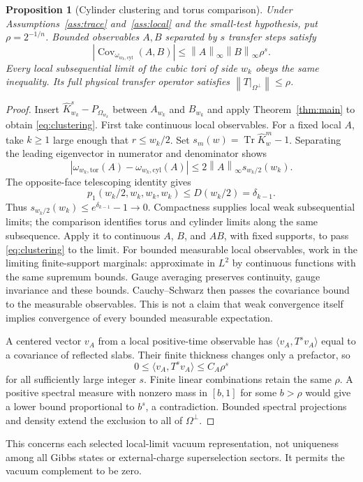 \documentclass[11pt]{article}
\newtheorem{proposition}[theorem]{Proposition}
\theoremstyle{definition}
\theoremstyle{remark}
\newcommand{\Tr}{\operatorname{Tr}}
\newcommand{\Cov}{\operatorname{Cov}}
\newcommand{\norm}[1]{\left\lVert#1\right\rVert}
\newcommand{\ip}[2]{\langle#1,#2\rangle}
\begin{document}
\begin{proposition}[Cylinder clustering and torus comparison]\label{prop:limits}
Under Assumptions~\ref{ass:trace} and~\ref{ass:local} and the small-test
hypothesis, put $\rho=2^{-1/n}$. Bounded observables $A,B$ separated by
$s$ transfer steps satisfy
\begin{equation}
 |\Cov_{\omega_{w_k,\mathrm{cyl}}}(A,B)|
 \le\norm{A}_\infty\norm{B}_\infty\rho^s.\label{eq:clustering}
\end{equation}
Every local subsequential limit of the cubic tori of side $w_k$ obeys the
same inequality. Its full physical transfer operator satisfies
$\norm{T|_{\Omega^\perp}}\le\rho$.
\end{proposition}
\begin{proof}
Insert $\widehat K_{w_k}^{s}-P_{\Omega_{w_k}}$ between $A_{w_k}$ and
$B_{w_k}$ and apply Theorem~\ref{thm:main} to obtain
\eqref{eq:clustering}.
First take continuous local observables. For a fixed local $A$, take
$k\ge1$ large enough that $r\le w_k/2$.
Set $s_m(w)=\Tr\widehat K_w^m-1$. Separating the leading eigenvector in
numerator and denominator shows
\begin{equation}
 |\omega_{w_k,\mathrm{tor}}(A)-\omega_{w_k,\mathrm{cyl}}(A)|
 \le2\norm{A}_\infty s_{w_k/2}(w_k).\label{eq:torus-cylinder}
\end{equation}
The opposite-face telescoping identity gives
\[
 p_1(w_k/2,w_k,w_k,w_k)\le D(w_k/2)=\delta_{k-1}.
\]
Thus $s_{w_k/2}(w_k)\le e^{\delta_{k-1}}-1\to0$.
Compactness supplies local weak subsequential limits; the comparison
identifies torus and cylinder limits along the same subsequence. Apply it
to continuous $A$, $B$, and $AB$, with fixed supports, to pass
\eqref{eq:clustering} to the limit. For bounded measurable local
observables, work in the limiting finite-support marginals: approximate
in $L^2$ by continuous functions with the same supremum bounds. Gauge
averaging preserves continuity, gauge invariance and these bounds.
Cauchy--Schwarz then passes the covariance bound to the measurable
observables. This is not a claim that weak convergence itself implies
convergence of every bounded measurable expectation.

A centered vector $v_A$ from a local positive-time observable has
$\ip{v_A}{T^sv_A}$ equal to a covariance of reflected slabs. Their finite
thickness changes only a prefactor, so
\[
 0\le\ip{v_A}{T^sv_A}\le C_A\rho^s
\]
for all sufficiently large integer $s$. Finite linear combinations retain
the same $\rho$. A positive spectral measure with nonzero mass in $[b,1]$
for some $b>\rho$ would give a lower bound proportional to $b^s$,
a contradiction. Bounded spectral projections and density extend the
exclusion to all of $\Omega^\perp$.
\end{proof}
This concerns each selected local-limit vacuum representation, not
uniqueness among all Gibbs states or external-charge superselection
sectors. It permits the vacuum complement to be zero.
\end{document}
